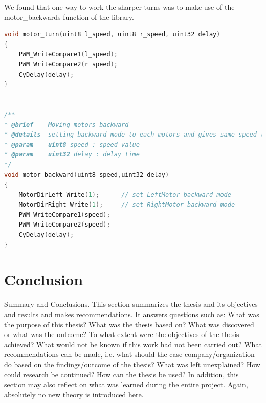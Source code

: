 \documentclass[11pt,a4paper,oneside,article]{memoir}
\begin{document}
We found that one way to work the sharper turns was to make use of the motor\_backwards function of the library.  
\vspace{-22pt}\begin{lstlisting}[language=C,caption={motor\_turn and motor\_backwards},label=backwards.c]
void motor_turn(uint8 l_speed, uint8 r_speed, uint32 delay)
{
    PWM_WriteCompare1(l_speed); 
    PWM_WriteCompare2(r_speed); 
    CyDelay(delay);
}


/**
* @brief    Moving motors backward
* @details  setting backward mode to each motors and gives same speed to each side of PWM
* @param    uint8 speed : speed value
* @param    uint32 delay : delay time
*/
void motor_backward(uint8 speed,uint32 delay)
{
    MotorDirLeft_Write(1);      // set LeftMotor backward mode
    MotorDirRight_Write(1);     // set RightMotor backward mode
    PWM_WriteCompare1(speed); 
    PWM_WriteCompare2(speed); 
    CyDelay(delay);
}
\end{lstlisting}\vspace{-22pt}


\chapter{Conclusion}

Summary and Conclusions. This section summarizes the thesis and its
objectives and results and makes recommendations. It answers
questions such as: What was the purpose of this thesis? What was the
thesis based on? What was discovered or what was the outcome? To
what extent were the objectives of the thesis achieved? What would not
be known if this work had not been carried out? What recommendations
can be made, i.e. what should the case company/organization do based
on the findings/outcome of the thesis? What was left unexplained? How
could research be continued? How can the thesis be used? In addition,
this section may also reflect on what was learned during the entire
project. Again, absolutely no new theory is introduced here.
\end{document}

